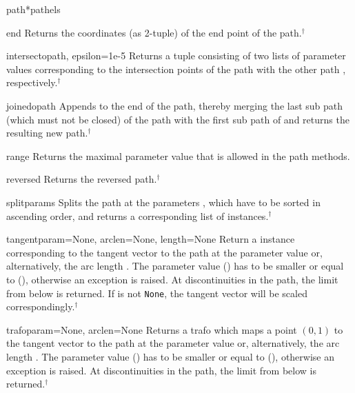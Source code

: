 \begin{classdesc}{path}{*pathels}
\begin{methoddesc}{end}{}
  Returns the coordinates (as 2-tuple) of the end point of the path.$^\dagger$
\end{methoddesc}

\begin{methoddesc}{intersect}{opath, epsilon=1e-5}
  Returns a tuple consisting of two lists of parameter values
  corresponding to the intersection points of the path with the other
  path , respectively.$^\dagger$
\end{methoddesc}

\begin{methoddesc}{joined}{opath}
  Appends  to the end of the path, thereby merging the last
  sub path (which must not be closed) of the path with the first sub
  path of  and returns the resulting new path.$^\dagger$
\end{methoddesc}

\begin{methoddesc}{range}{}
  Returns the maximal parameter value  that is allowed in the
  path methods.
\end{methoddesc}

\begin{methoddesc}{reversed}{}
  Returns the reversed path.$^\dagger$
\end{methoddesc}

\begin{methoddesc}{split}{params}
  Splits the path at the parameters , which have to be
  sorted in ascending order, and returns a corresponding list of
   instances.$^\dagger$
\end{methoddesc}

\begin{methoddesc}{tangent}{param=None, arclen=None, length=None}
  Return a  instance corresponding to the tangent vector
  to the path at the parameter value  or, alternatively, the arc length
  . The parameter value  () has to be smaller
  or equal to  (),
  otherwise an exception is raised.  At discontinuities in the path,
  the limit from below is returned. If  is not
  \texttt{None}, the tangent vector will be scaled correspondingly.$^\dagger$
\end{methoddesc}


\begin{methoddesc}{trafo}{param=None, arclen=None}
  Returns a trafo which maps a point $(0, 1)$ to the tangent vector to
  the path at the parameter value  or, alternatively, the
  arc length .  The parameter value  () has to
  be smaller or equal to 
  (), otherwise an exception is raised.  At
  discontinuities in the path, the limit from below is returned.$^\dagger$
\end{methoddesc}


\end{classdesc}
